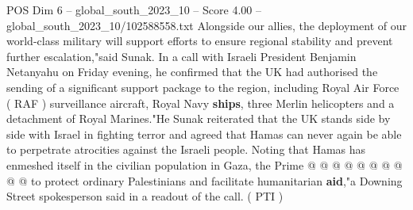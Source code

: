 \begin{textsample}{POS Dim 6 – global\_south\_2023\_10 – Score 4.00 – global\_south\_2023\_10/102588558.txt}
Alongside our allies, the deployment of our world-class military will support efforts to ensure regional stability and prevent further escalation,"said Sunak.
In a call with Israeli President Benjamin Netanyahu on Friday evening, he confirmed that the UK had authorised the sending of a significant support package to the region, including Royal Air Force ( RAF ) surveillance aircraft, Royal Navy \textbf{ships}, three Merlin helicopters and a detachment of Royal Marines."He Sunak reiterated that the UK stands side by side with Israel in fighting terror and agreed that Hamas can never again be able to perpetrate atrocities against the Israeli people.
Noting that Hamas has enmeshed itself in the civilian population in Gaza, the Prime @ @ @ @ @ @ @ @ @ @ to protect ordinary Palestinians and facilitate humanitarian \textbf{aid},"a Downing Street spokesperson said in a readout of the call. ( PTI )

\end{textsample}
